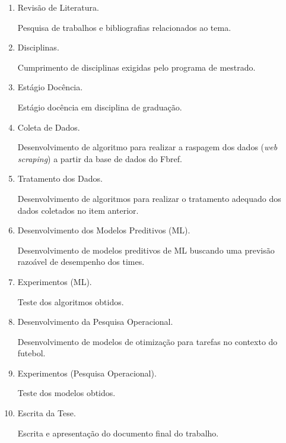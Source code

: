 \begin{enumerate}[label=\Alph*.]
    \item{Revisão de Literatura.}  
    
    Pesquisa de trabalhos e bibliografias relacionados ao tema.

    \item{Disciplinas.}  
    
    Cumprimento de disciplinas exigidas pelo programa de mestrado.

    \item{Estágio Docência.}  
    
    Estágio docência em disciplina de graduação.

    \item{Coleta de Dados.}  
    
    Desenvolvimento de algoritmo para realizar a raspagem dos dados (\textit{web scraping}) a partir da base de dados do Fbref.

    \item{Tratamento dos Dados.}  
    
    Desenvolvimento de algoritmos para realizar o tratamento adequado dos dados coletados no item anterior.

    \item{Desenvolvimento dos Modelos Preditivos (ML).}  
    
    Desenvolvimento de modelos preditivos de ML buscando uma previsão razoável de desempenho dos times.

    \item{Experimentos (ML).}  
    
    Teste dos algoritmos obtidos.

    \item{Desenvolvimento da Pesquisa Operacional.}  
    
    Desenvolvimento de modelos de otimização para tarefas no contexto do futebol.

    \item{Experimentos (Pesquisa Operacional).}  
    
    Teste dos modelos obtidos.

    \item{Escrita da Tese.}  
    
    Escrita e apresentação do documento final do trabalho.

\end{enumerate}
